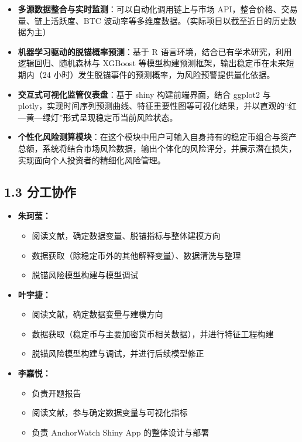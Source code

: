 \documentclass[
  letterpaper,
  DIV=11,
  numbers=noendperiod]{scrartcl}
\providecommand{\tightlist}{%
  \setlength{\itemsep}{0pt}\setlength{\parskip}{0pt}}
\begin{document}
\begin{itemize}
\item
  \textbf{多源数据整合与实时监测}：可以自动化调用链上与市场
  API，整合价格、交易量、链上活跃度、BTC
  波动率等多维度数据。（实际项目以截至近日的历史数据为主）
\item
  \textbf{机器学习驱动的脱锚概率预测}：基于 R
  语言环境，结合已有学术研究，利用逻辑回归、随机森林与 XGBoost
  等模型构建预测框架，输出稳定币在未来短期内（24
  小时）发生脱锚事件的预测概率，为风险预警提供量化依据。
\item
  \textbf{交互式可视化监管仪表盘}：基于 shiny 构建前端界面，结合 ggplot2
  与
  plotly，实现时间序列预测曲线、特征重要性图等可视化结果，并以直观的``红---黄---绿灯''形式呈现稳定币当前风险状态。
\item
  \textbf{个性化风险测算模块}：在这个模块中用户可输入自身持有的稳定币组合与资产总额，系统将结合市场风险数据，输出个体化的风险评分，并展示潜在损失，实现面向个人投资者的精细化风险管理。
\end{itemize}

\subsection{1.3 分工协作}\label{ux5206ux5de5ux534fux4f5c}

\begin{itemize}
\tightlist
\item
  \textbf{朱珂莹：}

  \begin{itemize}
  \tightlist
  \item
    阅读文献，确定数据变量、脱锚指标与整体建模方向
  \item
    数据获取（除稳定币外的其他解释变量）、数据清洗与整理
  \item
    脱锚风险模型构建与模型调试
  \end{itemize}
\item
  \textbf{叶宇捷：}

  \begin{itemize}
  \tightlist
  \item
    阅读文献，确定数据变量与建模方向
  \item
    数据获取（稳定币与主要加密货币相关数据），并进行特征工程构建
  \item
    脱锚风险模型构建与调试，并进行后续模型修正
  \end{itemize}
\item
  \textbf{李嘉悦：}

  \begin{itemize}
  \tightlist
  \item
    负责开题报告
  \item
    阅读文献，参与确定数据变量与可视化指标
  \item
    负责 AnchorWatch Shiny App 的整体设计与部署
  \end{itemize}
\end{itemize}
\end{document}
